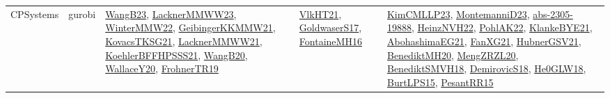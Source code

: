 {\begin{longtable}{lp{3cm}>{\raggedright}p{6cm}>{\raggedright}p{6cm}p{8cm}}
CPSystems & gurobi & \href{papers/WangB23.pdf}{WangB23}\cite{WangB23}, \href{articles/LacknerMMWW23.pdf}{LacknerMMWW23}\cite{LacknerMMWW23}, \href{papers/WinterMMW22.pdf}{WinterMMW22}\cite{WinterMMW22}, \href{papers/GeibingerKKMMW21.pdf}{GeibingerKKMMW21}\cite{GeibingerKKMMW21}, \href{papers/KovacsTKSG21.pdf}{KovacsTKSG21}\cite{KovacsTKSG21}, \href{papers/LacknerMMWW21.pdf}{LacknerMMWW21}\cite{LacknerMMWW21}, \href{articles/KoehlerBFFHPSSS21.pdf}{KoehlerBFFHPSSS21}\cite{KoehlerBFFHPSSS21}, \href{papers/WangB20.pdf}{WangB20}\cite{WangB20}, \href{articles/WallaceY20.pdf}{WallaceY20}\cite{WallaceY20}, \href{papers/FrohnerTR19.pdf}{FrohnerTR19}\cite{FrohnerTR19} & \href{articles/VlkHT21.pdf}{VlkHT21}\cite{VlkHT21}, \href{papers/GoldwaserS17.pdf}{GoldwaserS17}\cite{GoldwaserS17}, \href{papers/FontaineMH16.pdf}{FontaineMH16}\cite{FontaineMH16} & \href{papers/KimCMLLP23.pdf}{KimCMLLP23}\cite{KimCMLLP23}, \href{articles/MontemanniD23.pdf}{MontemanniD23}\cite{MontemanniD23}, \href{articles/abs-2305-19888.pdf}{abs-2305-19888}\cite{abs-2305-19888}, \href{articles/HeinzNVH22.pdf}{HeinzNVH22}\cite{HeinzNVH22}, \href{articles/PohlAK22.pdf}{PohlAK22}\cite{PohlAK22}, \href{papers/KlankeBYE21.pdf}{KlankeBYE21}\cite{KlankeBYE21}, \href{articles/AbohashimaEG21.pdf}{AbohashimaEG21}\cite{AbohashimaEG21}, \href{articles/FanXG21.pdf}{FanXG21}\cite{FanXG21}, \href{articles/HubnerGSV21.pdf}{HubnerGSV21}\cite{HubnerGSV21}, \href{articles/BenediktMH20.pdf}{BenediktMH20}\cite{BenediktMH20}, \href{articles/MengZRZL20.pdf}{MengZRZL20}\cite{MengZRZL20}, \href{papers/BenediktSMVH18.pdf}{BenediktSMVH18}\cite{BenediktSMVH18}, \href{papers/DemirovicS18.pdf}{DemirovicS18}\cite{DemirovicS18}, \href{papers/He0GLW18.pdf}{He0GLW18}\cite{He0GLW18}, \href{papers/BurtLPS15.pdf}{BurtLPS15}\cite{BurtLPS15}, \href{papers/PesantRR15.pdf}{PesantRR15}\cite{PesantRR15}\\

\end{longtable}}

